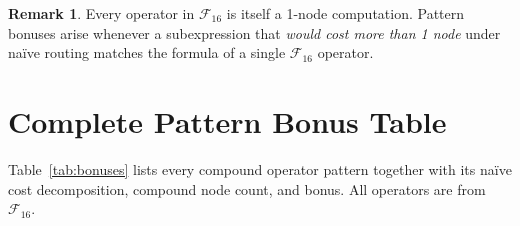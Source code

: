 \documentclass[12pt,a4paper]{article}
\theoremstyle{definition}
\newtheorem{remark}[theorem]{Remark}
\begin{document}
\begin{remark}
Every operator in $\mathcal{F}_{16}$ is itself a 1-node computation.
Pattern bonuses arise whenever a subexpression that \emph{would cost more
than 1 node} under na\"{i}ve routing matches the formula of a single
$\mathcal{F}_{16}$ operator.
\end{remark}

\section{Complete Pattern Bonus Table}
\label{sec:table}

Table~\ref{tab:bonuses} lists every compound operator pattern together with
its na\"{i}ve cost decomposition, compound node count, and bonus.
All operators are from $\mathcal{F}_{16}$.
\end{document}
